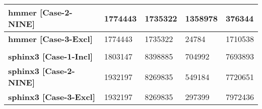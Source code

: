 \documentclass[12pt]{article}
\begin{document}
\begin{table}[]
{\begin{tabular}{|l|l|l|l|l|}
\textbf{hmmer    {[}Case-2-NINE{]}} & 1774443    & 1735322 & 1358978 & 376344  \\ \hline
\textbf{hmmer    {[}Case-3-Excl{]}} & 1774443    & 1735322 & 24784   & 1710538 \\ \hline
\textbf{}                           &            &         &         &         \\ \hline
\textbf{sphinx3  {[}Case-1-Incl{]}} & 1803147    & 8398885 & 704992  & 7693893 \\ \hline
\textbf{sphinx3  {[}Case-2-NINE{]}} & 1932197    & 8269835 & 549184  & 7720651 \\ \hline
\textbf{sphinx3  {[}Case-3-Excl{]}} & 1932197    & 8269835 & 297399  & 7972436 \\ \hline
\end{tabular}%
}
\end{table}



\begin{table}[]
\centering
\caption{L3 Miss Classification (Fully Associative LRU L3 Cache)}
\label{tab:my-table}
\end{table}
\end{document}
